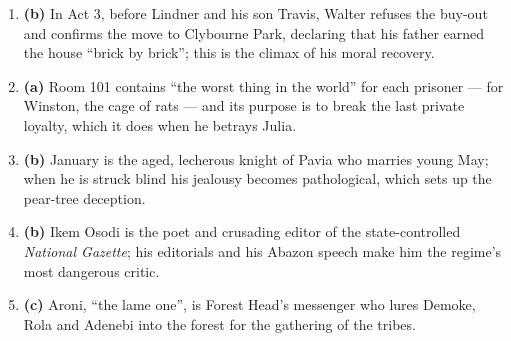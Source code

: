 \documentclass[11pt]{article}
\begin{document}
\begin{corrige}
\begin{enumerate}
\item \textbf{(b)} In Act 3, before Lindner and his son Travis, Walter refuses the buy-out and confirms the move to Clybourne Park, declaring that his father earned the house ``brick by brick''; this is the climax of his moral recovery.
\item \textbf{(a)} Room 101 contains ``the worst thing in the world'' for each prisoner --- for Winston, the cage of rats --- and its purpose is to break the last private loyalty, which it does when he betrays Julia.
\item \textbf{(b)} January is the aged, lecherous knight of Pavia who marries young May; when he is struck blind his jealousy becomes pathological, which sets up the pear-tree deception.
\item \textbf{(b)} Ikem Osodi is the poet and crusading editor of the state-controlled \emph{National Gazette}; his editorials and his Abazon speech make him the regime's most dangerous critic.
\item \textbf{(c)} Aroni, ``the lame one'', is Forest Head's messenger who lures Demoke, Rola and Adenebi into the forest for the gathering of the tribes.
\end{enumerate}
\end{corrige}
\end{document}
